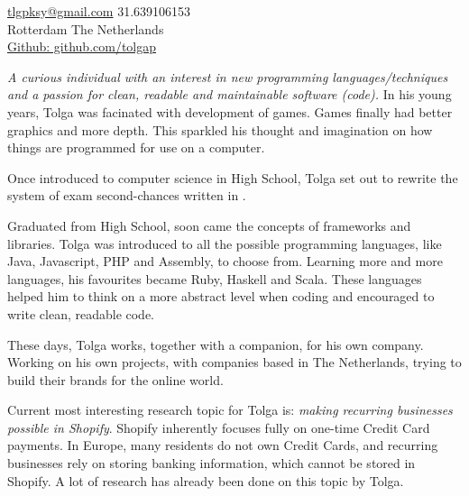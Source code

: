 \documentclass[10pt,a4paper]{article}
\begin{document}
\sloppy  %



\nobreakvspace{0.3em}  %

\begin{multicols}{2}
\noindent\href{mailto:tlgpksy.at.gmail.dot.com}{tlgpksy\mbox{}@\mbox{}gmail.com}\sbull
\textsmaller{+}31.639106153
\\
Rotterdam\sbull
The Netherlands
\\
{\href{https://github.com/tolgap}{Github: github.com/tolgap}}
\end{multicols}

\spacedhrule{0.9em}{-0.4em}  %


\vspace{-1.2em} %
\begin{multicols}{2} %
\noindent \emph{A curious individual with an interest in new programming languages/techniques and a passion for clean, readable and maintainable software (code).}
\smallskip
In his young years, Tolga was facinated with development of  games. Games finally had better graphics and more depth. This sparkled his thought and imagination on how things are programmed for use on a computer.

Once introduced to computer science in High School, Tolga set out to rewrite the system of exam second-chances written in .

Graduated from High School, soon came the concepts of frameworks and libraries. Tolga was introduced to all the possible programming languages, like Java, Javascript, PHP and Assembly, to choose from. Learning more and more languages, his favourites became Ruby, Haskell and Scala. These languages helped him to think on a more abstract level when coding and encouraged to write clean, readable code.

These days, Tolga works, together with a companion, for his own company. Working on his own projects, with companies based in The Netherlands, trying to build their brands for the online world.

Current most interesting research topic for Tolga is: \emph{making recurring businesses possible in Shopify}. Shopify inherently focuses fully on one-time Credit Card payments. In Europe, many residents do not own Credit Cards, and recurring businesses rely on storing banking information, which cannot be stored in Shopify. A lot of research has already been done on this topic by Tolga.
\end{multicols}
\end{document}
